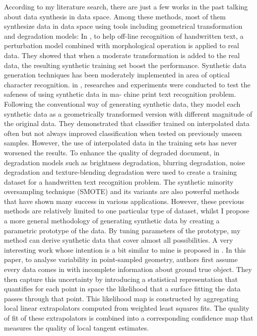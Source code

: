 \documentclass{iitthesis}
\begin{document}
According to my literature search, there are just a few works in the past talking about data synthesis in data space. Among these methods, most of them synthesize data in data space using tools including geometrical transformation and degradation models: In \cite{VT:03}\cite{VT:04}, to help off-line recognition of handwritten text, a perturbation model combined with morphological operation is applied to real data. They showed that when a moderate transformation is added to the real data, the resulting synthetic training set boost the performance. Synthetic data generation techniques has been moderately implemented in area of optical character recognition. in \cite{NJ:09}, researches and experiments were conducted to test the safeness of using synthetic data in ma-
chine print text recognition problem. Following the conventional way of generating synthetic data, they model each synthetic data as a geometrically transformed version with different magnitude of the original data. They demonstrated that classifier trained on interpolated data often but not always improved classification when tested on previously unseen samples. However, the use of interpolated data in the training sets has never worsened the results. To enhance the quality of degraded document, in \cite{BG:08} degradation models such as brightness degradation, blurring degradation, noise degradation and texture-blending degradation were used to create a training dataset for a handwritten text recognition problem. The synthetic minority oversampling technique (SMOTE) \cite{CNV:02} and its variants \cite{HH:05}\cite{HH:08} are also powerful methods that have shown many success in various applications.  However, these previous methods are relatively limited to one particular type of dataset, whilst  I propose a more general  methodology of generating synthetic data by creating a parametric prototype of the data. By tuning parameters of the prototype, my method can derive synthetic data that cover almost all possibilities. A very interesting work whose intention is a bit similar to mine is proposed in \cite{Pauly:2004:UVP:2386332.2386346}. In this paper, to analyse variability in point-sampled geometry, authors first assume every data comes in with incomplete information about ground true object. They then capture this uncertainty by introducing a statistical representation that quantifies for each point in space the likelihood that a surface fitting the data passes through that point. This likelihood map is constructed by aggregating local linear extrapolators computed from weighted least squares fits. The quality of fit of these extrapolators is combined into a corresponding confidence map that measures the quality of local tangent estimates.
\end{document}
